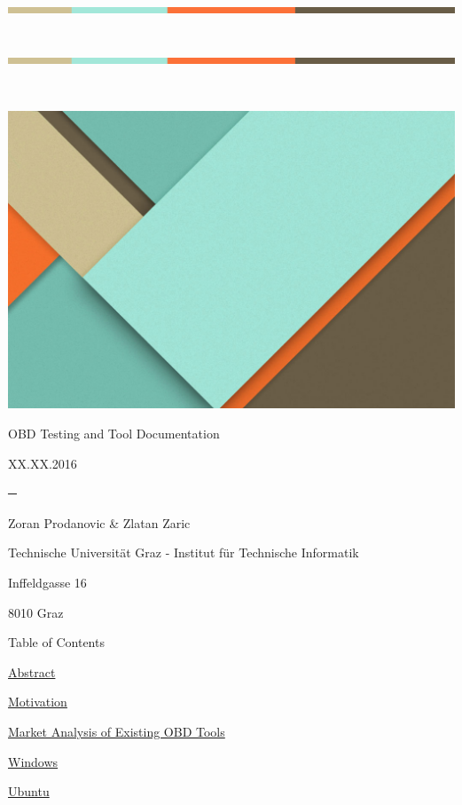 {~ }

{\includegraphics{images/image06.png}}

\subsection{\texorpdfstring{{\protect\includegraphics{images/image06.png}}{~}}{~}}\label{h.z6ne0og04bp5}

{\includegraphics{images/image02.jpg}}

{OBD Testing and Tool Documentation}

{XX.XX.2016}

{─}

{Zoran Prodanovic \& Zlatan Zaric}

{Technische Universität Graz - Institut für Technische Informatik}

{Inffeldgasse 16 }

{8010 Graz}

{Table of Contents}

{}

{\protect\hyperlink{h.w1vd037gtz71}{Abstract}}

{\protect\hyperlink{h.ca2gtl63cpbb}{Motivation}}

{\protect\hyperlink{h.ku3zfbnqma3q}{Market Analysis of Existing OBD
Tools}}

{\protect\hyperlink{h.6vg54mt7ey8d}{Windows}}

{\protect\hyperlink{h.plxr4kgyruuo}{Ubuntu}}


